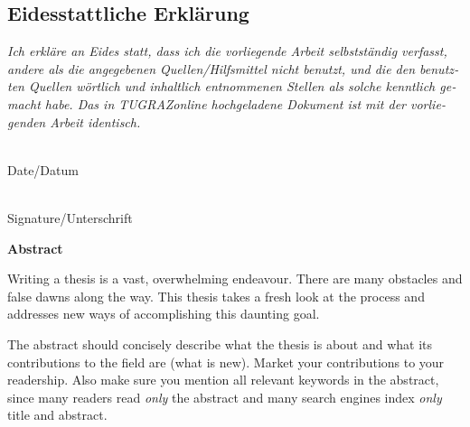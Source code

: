 \vspace{1cm}


\begin{otherlanguage}{austrian}

\subsection*{Eidesstattliche Erklärung}
\noindent
\textit{
Ich erkläre an Eides statt, dass ich die vorliegende Arbeit
selbstständig verfasst, andere als die angegebenen Quellen/Hilfsmittel
nicht benutzt, und die den benutzten Quellen wörtlich und inhaltlich
entnommenen Stellen als solche kenntlich gemacht habe. Das in
TUGRAZonline hochgeladene Dokument ist mit der vorliegenden
Arbeit identisch.}

\vspace{2cm}

\noindent
\parbox[top]{4cm}{
\begin{center}
\underline{\hspace*{4cm}} \\
Date/Datum
\end{center}
}
%
\hfill
%
\parbox[top]{6cm}{
\begin{center}
\underline{\hspace*{6cm}} \\
Signature/Unterschrift
\end{center}
} 

\end{otherlanguage}






\cleardoublepage

\vspace*{2cm}

\begin{center}
{\Large\sffamily\bfseries Abstract}
\end{center}


Writing a thesis is a vast, overwhelming endeavour. There are many
obstacles and false dawns along the way. This thesis takes a fresh
look at the process and addresses new ways of accomplishing this
daunting goal.

The abstract should concisely describe what the thesis is about and
what its contributions to the field are (what is new). Market your
contributions to your readership. Also make sure you mention all
relevant keywords in the abstract, since many readers read \emph{only}
the abstract and many search engines index \emph{only} title and
abstract.

